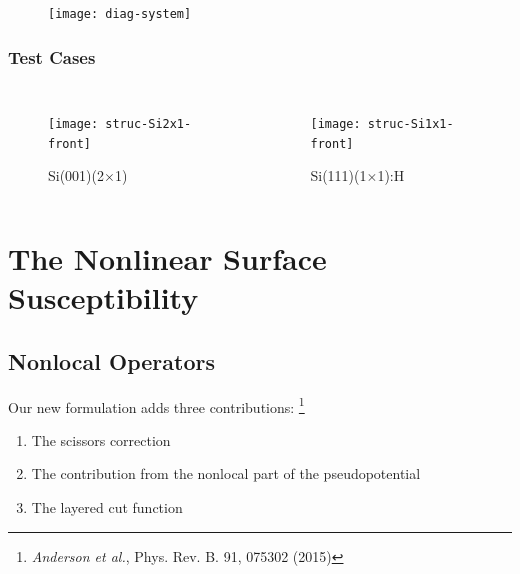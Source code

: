 \documentclass{beamer}
\begin{document}
\begin{frame}
\begin{figure}
\centering
\texttt{[image: diag-system]}
\end{figure}
\end{frame}

\begin{frame}
\frametitle{Test Cases}
\begin{columns}
\begin{figure}
\centering
\texttt{[image: struc-Si2x1-front]}
\caption{Si(001)(2$\times$1)}
\end{figure}
\begin{figure}
\centering
\texttt{[image: struc-Si1x1-front]}
\caption{Si(111)(1$\times$1):H}
\end{figure}
\end{columns}
\end{frame}



\section{The Nonlinear Surface Susceptibility}



\subsection{Nonlocal Operators}

\begin{frame}
Our new formulation adds three contributions:%
\footnote{\emph{Anderson et al.}, Phys. Rev. B. 91, 075302 (2015)}
\begin{enumerate}
\item The scissors correction
\item The contribution from the nonlocal part of the pseudopotential
\item The layered cut function
\end{enumerate}
\end{frame}
\end{document}
